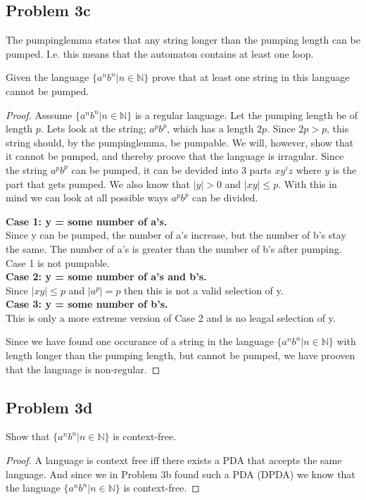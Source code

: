 \documentclass{article}
\begin{document}
\subsection{Problem 3c}
The pumpinglemma states that any string longer than the pumping length can be pumped. I.e. this means that the automaton contains at least one loop.

Given the language $\{a^nb^n | n \in \mathbb{N}\}$ prove that at least one string in this language cannot be pumped.

\begin{proof}
  Asssume $\{a^nb^n | n \in \mathbb{N}\}$ is a regular language. Let the pumping length be of length $p$. Lets look at the string; $a^pb^p$, which has a length $2p$. Since $2p> p$, this string should, by the pumpinglemma, be pumpable.
  We will, however, show that it cannot be pumped, and thereby proove that the language is irragular.
  Since the string $a^pb^p$ can be pumped, it can be devided into 3 parts $xy^iz$ where $y$ is the part that gets pumped. We also know that $|y| > 0$ and $|xy| \leq p$. With this in mind we can look at all possible ways $a^pb^p$ can be divided.

  \textbf{Case 1: y = some number of a's.}\\
  Since y can be pumped, the number of a's increase, but the number of b's stay the same. The number of a's is greater than the number of b's after pumping. Case 1 is not pumpable. \\
  \textbf{Case 2: y = some number of a's and b's.}\\
  Since $|xy| \leq p$ and $|a^p| = p$ then this is not a valid selection of y. \\
  \textbf{Case 3: y = some number of b's.}\\
  This is only a more extreme version of Case 2 and is no leagal selection of y.


  Since we have found one occurance of a string in the language $\{a^nb^n | n \in \mathbb{N}\}$ with length longer than the pumping length, but cannot be pumped, we have prooven that the language is non-regular.

\end{proof}






\subsection{Problem 3d}
Show that $\{a^nb^n | n \in \mathbb{N}\}$ is context-free.
\begin{proof}
A language is context free iff there exists a PDA that accepts the same language. And since we in Problem 3b found such a PDA (DPDA) we know that the language $\{a^nb^n | n \in \mathbb{N}\}$ is context-free.
\end{proof}
\end{document}
